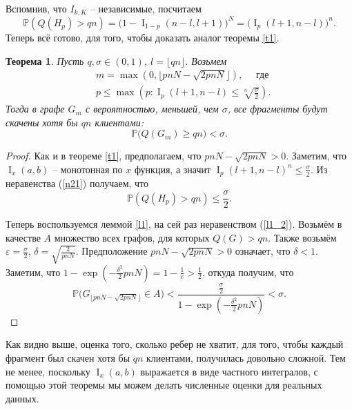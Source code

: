 \documentclass{matmex-diploma-custom}
\newcommand{\PRob}{\mathbb P}
\newcommand{\leqs}{\leqslant}
\newcommand{\geqs}{\geqslant}
\newcommand{\eps}{\varepsilon}
\DeclareMathOperator{\I}{I}
\newtheorem{theorem}{Теорема}
\theoremstyle{named}
\begin{document}
Вспомнив, что $I_{k,K}$ -- независимые, посчитаем
\begin{equation}\label{n21}
\PRob(Q(H_p) > qn) = \big(1 - \I_{1-p}(n-l, l+1)\big)^N = \big(\I_{p}(l+1, n-l)\big)^n.
\end{equation}
Теперь всё готово, для того, чтобы доказать аналог теоремы \ref{t1}.

\begin{theorem}\label{t2}
Пусть $q, \sigma \in (0, 1)$, $l = \lfloor qn \rfloor$. Возьмем 
\begin{align}
& m = \max(0, \lfloor pnN - \sqrt{2pnN} \rfloor), \quad \text{ где} \\
& p \leqs \max\left(p :  \I_p(l+1, n-l) \leqs \sqrt[n]{\frac\sigma{2}} \right).
\end{align}
Тогда в графе $G_m$ с вероятностью, меньшей, чем $\sigma$, все фрагменты будут скачены хотя бы $qn$ клиентами:
\begin{equation}
\PRob\big(Q(G_m) \geqs qn\big) < \sigma.
\end{equation}
\end{theorem}


\begin{proof}
Как и в теореме \ref{t1}, предполагаем, что $pnN - \sqrt{2pnN} > 0$.
Заметим, что $\I_x(a,b)$ -- монотонная по $x$ функция, а значит $\I_p(l+1, n-l)^n \leqs \frac\sigma{2}$. 
Из неравенства (\ref{n21}) получаем, что
\begin{equation}
\PRob(Q(H_p) > qn) \leqs \frac\sigma{2}.
\end{equation}

Теперь воспользуемся леммой \ref{l1}, на сей раз неравенством (\ref{l1_2}).
Возьмём в качестве $A$ множество всех графов, для которых $Q(G) > qn$.
Также возьмём $\eps = \frac\sigma{2}$, $\delta = \sqrt{\frac{2}{pnN}}$.
Предположение $pnN - \sqrt{2pnN} > 0$ означает, что $\delta < 1$.
Заметим, что $1 - \exp\left(-\frac{\delta^2}{2}pnN\right) = 1 - \frac{1}{e} > \frac{1}{2}$, откуда получим, что
\begin{equation}
\PRob\big(G_{\lfloor pnN - \sqrt{2pnN} \rfloor} \in A\big) 
	< 
\frac{\frac\sigma{2}}{1 - \exp\left(-\frac{\delta^2}{2}pnN\right)}
	<
\sigma.
\end{equation}
\end{proof}

Как видно выше, оценка того, сколько ребер не хватит, для того, 
чтобы каждый фрагмент был скачен хотя бы $qn$ клиентами, получилась довольно сложной.
Тем не менее, поскольку $\I_x(a, b)$ выражается в виде частного интегралов, 
с помощью этой теоремы мы можем делать численные оценки для реальных данных.
\end{document}
